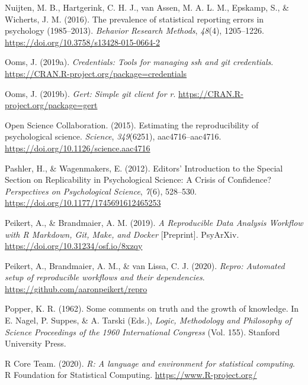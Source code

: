 \documentclass[12pt,a4paper,twoside]{article}
\begin{document}
\leavevmode\hypertarget{ref-nuijtenPrevalenceStatisticalReporting2016}{}%
Nuijten, M. B., Hartgerink, C. H. J., van Assen, M. A. L. M., Epskamp, S., \& Wicherts, J. M. (2016). The prevalence of statistical reporting errors in psychology (1985--2013). \emph{Behavior Research Methods}, \emph{48}(4), 1205--1226. \url{https://doi.org/10.3758/s13428-015-0664-2}

\leavevmode\hypertarget{ref-R-credentials}{}%
Ooms, J. (2019a). \emph{Credentials: Tools for managing ssh and git credentials}. \url{https://CRAN.R-project.org/package=credentials}

\leavevmode\hypertarget{ref-R-gert}{}%
Ooms, J. (2019b). \emph{Gert: Simple git client for r}. \url{https://CRAN.R-project.org/package=gert}

\leavevmode\hypertarget{ref-opensciencecollaborationEstimatingReproducibilityPsychological2015}{}%
Open Science Collaboration. (2015). Estimating the reproducibility of psychological science. \emph{Science}, \emph{349}(6251), aac4716--aac4716. \url{https://doi.org/10.1126/science.aac4716}

\leavevmode\hypertarget{ref-pashlerEditorsIntroductionSpecial2012}{}%
Pashler, H., \& Wagenmakers, E. (2012). Editors' Introduction to the Special Section on Replicability in Psychological Science: A Crisis of Confidence? \emph{Perspectives on Psychological Science}, \emph{7}(6), 528--530. \url{https://doi.org/10.1177/1745691612465253}

\leavevmode\hypertarget{ref-peikertReproducibleDataAnalysis2019}{}%
Peikert, A., \& Brandmaier, A. M. (2019). \emph{A Reproducible Data Analysis Workflow with R Markdown, Git, Make, and Docker} {[}Preprint{]}. PsyArXiv. \url{https://doi.org/10.31234/osf.io/8xzqy}

\leavevmode\hypertarget{ref-R-repro}{}%
Peikert, A., Brandmaier, A. M., \& van Lissa, C. J. (2020). \emph{Repro: Automated setup of reproducible workflows and their dependencies}. \url{https://github.com/aaronpeikert/repro}

\leavevmode\hypertarget{ref-popperCommentsTruthGrowth1962}{}%
Popper, K. R. (1962). Some comments on truth and the growth of knowledge. In E. Nagel, P. Suppes, \& A. Tarski (Eds.), \emph{Logic, Methodology and Philosophy of Science Proceedings of the 1960 International Congress} (Vol. 155). Stanford University Press.

\leavevmode\hypertarget{ref-R-base}{}%
R Core Team. (2020). \emph{R: A language and environment for statistical computing}. R Foundation for Statistical Computing. \url{https://www.R-project.org/}
\end{document}
